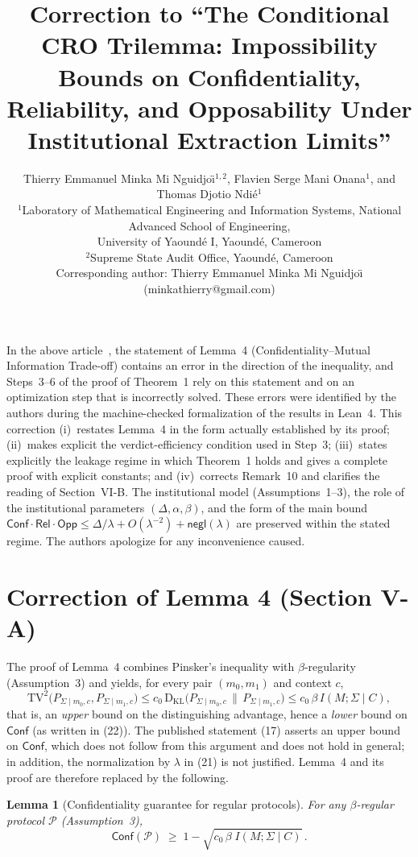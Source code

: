 \documentclass[10pt,a4paper]{article}
\title{\textbf{Correction to ``The Conditional CRO Trilemma: Impossibility Bounds
on Confidentiality, Reliability, and Opposability Under Institutional
Extraction Limits''}}
\author{Thierry Emmanuel Minka Mi Nguidjo\"{\i}$^{1,2}$,
        Flavien Serge Mani Onana$^{1}$,
        and Thomas Djotio Ndi\'e$^{1}$\\[4pt]
\small $^{1}$Laboratory of Mathematical Engineering and Information Systems,
National Advanced School of Engineering,\\
\small University of Yaound\'e I, Yaound\'e, Cameroon\\
\small $^{2}$Supreme State Audit Office, Yaound\'e, Cameroon\\[2pt]
\small Corresponding author: Thierry Emmanuel Minka Mi Nguidjo\"{\i}
(minkathierry@gmail.com)}
\date{}
\newtheorem{lemma}{Lemma}
\theoremstyle{remark}
\newcommand{\Conf}{\mathsf{Conf}}
\newcommand{\Rel}{\mathsf{Rel}}
\newcommand{\Opp}{\mathsf{Opp}}
\newcommand{\TV}{\mathrm{TV}}
\newcommand{\KL}{\mathrm{D}_{\mathrm{KL}}}
\newcommand{\negl}{\mathsf{negl}}
\newcommand{\cP}{\mathcal{P}}
\newcommand{\IMS}{I(M;\Sigma\mid C)}
\begin{document}
\maketitle

\noindent In the above article~\cite{orig}, the statement of Lemma~4
(Confidentiality--Mutual Information Trade-off) contains an error in the
direction of the inequality, and Steps~3--6 of the proof of Theorem~1 rely
on this statement and on an optimization step that is incorrectly solved.
These errors were identified by the authors during the machine-checked
formalization of the results in Lean~4. This correction
(i)~restates Lemma~4 in the form actually established by its proof;
(ii)~makes explicit the verdict-efficiency condition used in Step~3;
(iii)~states explicitly the leakage regime in which Theorem~1 holds and gives
a complete proof with explicit constants; and
(iv)~corrects Remark~10 and clarifies the reading of Section~VI-B.
The institutional model (Assumptions~1--3), the role of the institutional
parameters $(\Delta,\alpha,\beta)$, and the form of the main bound
$\Conf\cdot\Rel\cdot\Opp \le \Delta/\lambda + O(\lambda^{-2}) + \negl(\lambda)$
are preserved within the stated regime. The authors apologize for any
inconvenience caused.

\section{Correction of Lemma 4 (Section V-A)}

The proof of Lemma~4 combines Pinsker's inequality with $\beta$-regularity
(Assumption~3) and yields, for every pair $(m_0,m_1)$ and context $c$,
\begin{equation*}
\TV^2\bigl(P_{\Sigma\mid m_0,c},P_{\Sigma\mid m_1,c}\bigr)
\le c_0\,\KL\bigl(P_{\Sigma\mid m_0,c}\,\|\,P_{\Sigma\mid m_1,c}\bigr)
\le c_0\,\beta\,\IMS ,
\end{equation*}
that is, an \emph{upper} bound on the distinguishing advantage, hence a
\emph{lower} bound on $\Conf$ (as written in (22)). The published statement
(17) asserts an upper bound on $\Conf$, which does not follow from this
argument and does not hold in general; in addition, the normalization by
$\lambda$ in (21) is not justified. Lemma~4 and its proof are therefore
replaced by the following.

\begin{lemma}[Confidentiality guarantee for regular protocols]
For any $\beta$-regular protocol $\cP$ (Assumption~3),
\begin{equation*}\tag{17$'$}\label{eq:lemma4}
\Conf(\cP) \;\ge\; 1-\sqrt{c_0\,\beta\;\IMS}\,.
\end{equation*}
\end{lemma}
\end{document}
